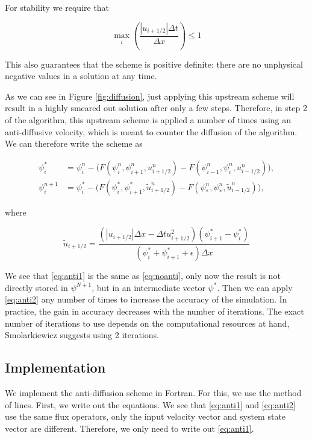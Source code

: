 \documentclass[10pt, a4paper]{article}
\newcommand{\abs}[1]{\left\lvert#1\right\rvert}
\begin{document}
For stability we require that

\begin{equation}
\max_{i}\left(\frac{\abs{u_{i+1/2}}\Delta t}{\Delta x}\right) \leq 1
\end{equation}

This also guarantees that the scheme is positive definite: there are no unphysical negative values in a solution at any time.

As we can see in Figure \ref{fig:diffusion}, just applying this upstream scheme will result in a highly smeared out solution after only a few steps. Therefore, in step 2 of the algorithm, this upstream scheme is applied a number of times using an anti-diffusive velocity, which is meant to counter the diffusion of the algorithm. We can therefore write the scheme as

\begin{align}
 \psi_i^{*} &= \psi_i^n - \Big( F \left( \psi_i^n,\psi_{i+1}^n,u_{i+1/2}^n\right)
-F \left( \psi_{i-1}^n,\psi_{i}^n,u_{i-1/2}^n\right) \Big),\label{eq:anti1}\\
 \psi_i^{n+1} &= \psi_i^* - \Big( F \left( \psi_i^*,\psi_{i+1}^*,\tilde{u}_{i+1/2}^n\right)
-F \left( \psi_{*}^n,\psi_{*}^n,\tilde{u}_{i-1/2}^n\right) \Big),\label{eq:anti2}\,
\end{align}

where

\begin{equation}
\tilde{u}_{i+1/2} = \frac{\left(\abs{u_{i+1/2}}\Delta x - \Delta t u_{i+1/2}^2 \right) \left( \psi_{i+1}^*-\psi_i^*\right)}{ \left( \psi_i^*+\psi_{i+1}^*+\epsilon \right) \Delta x}
\end{equation}

We see that \ref{eq:anti1} is the same as \ref{eq:noanti}, only now the result is not directly stored in $\psi^{N+1}$, but in an intermediate vector $\psi^*$. Then we can apply \ref{eq:anti2} any number of times to increase the accuracy of the simulation. In practice, the gain in accuracy decreases with the number of iterations. The exact number of iterations to use depends on the computational resources at hand, Smolarkiewicz suggests using 2 iterations.

\subsection{Implementation}
\label{sec:implementation}
We implement the anti-diffusion scheme in Fortran. For this, we use the method of lines. First, we write out the equations. We see that \ref{eq:anti1} and \ref{eq:anti2} use the same flux operators, only the input velocity vector and system state vector are different. Therefore, we only need to write out \ref{eq:anti1}.
\end{document}
